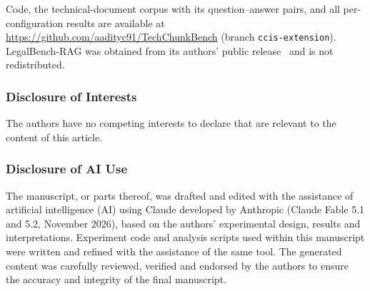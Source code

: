 \documentclass[runningheads]{llncs}
\begin{document}
\begin{credits}
\subsubsection{\ackname}
Code, the technical-document corpus with its question--answer pairs, and all per-configuration results are available at \url{https://github.com/aadityc91/TechChunkBench} (branch \texttt{ccis-extension}). LegalBench-RAG was obtained from its authors' public release~\cite{pipitone2024legalbenchrag} and is not redistributed.

\subsubsection{Disclosure of Interests}
The authors have no competing interests to declare that are relevant to the content of this article.

\subsubsection{Disclosure of AI Use}
The manuscript, or parts thereof, was drafted and edited with the assistance of artificial intelligence (AI) using Claude developed by Anthropic (Claude Fable 5.1 and 5.2, November 2026), based on the authors' experimental design, results and interpretations. Experiment code and analysis scripts used within this manuscript were written and refined with the assistance of the same tool. The generated content was carefully reviewed, verified and endorsed by the authors to ensure the accuracy and integrity of the final manuscript.
\end{credits}



\end{document}
